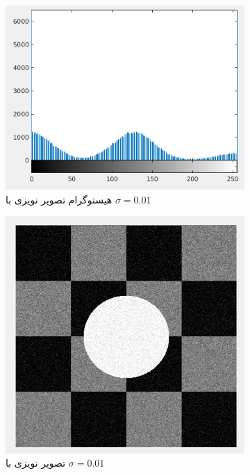 \documentclass[11.5pt,a4paper]{article}
\begin{document}
\begin{figure}[h]
	\begin{subfigure}{.3\textwidth}
		\includegraphics[scale=0.2]{Imgs/NB_S01_Hist.png}
		\caption{هیستوگرام تصویر نویزی با $\sigma=0.01$}
	\end{subfigure}
	\begin{subfigure}{.3\textwidth}
		\includegraphics[scale=0.2]{Imgs/NB_S01_In.png}
		\caption{تصویر نویزی با $\sigma=0.01$}
	\end{subfigure}
	\begin{subfigure}{.3\textwidth}

\end{subfigure}
\end{figure}
\end{document}
